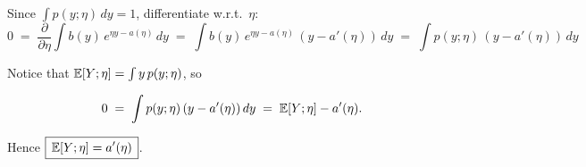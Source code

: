 \begin{answer}

Since $\int p(y;\eta)\,dy=1$, differentiate w.r.t.\ $\eta$:
\[
0 \;=\; \frac{\partial}{\partial \eta} \int b(y)\,e^{\eta y - a(\eta)}\,dy
  \;=\; \int b(y)\,e^{\eta y - a(\eta)}\,(y - a'(\eta))\,dy
  \;=\; \int p(y;\eta)\,(y - a'(\eta))\,dy
\]

Notice that $\mathbb{E}[Y;\eta] = \int y \, p(y;\eta)$, so

\[
0 \;=\; \int p(y;\eta)\,(y - a'(\eta))\,dy
  \;=\; \mathbb{E}[Y;\eta] - a'(\eta).
\]

Hence $\boxed{\,\mathbb{E}[Y;\eta]=a'(\eta)\,}$.

\end{answer}
